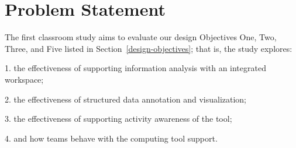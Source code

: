 \section{Problem Statement}

The first classroom study aims to evaluate our design Objectives One, Two, Three, and Five listed in Section~\ref{design-objectives}; that is, the study explores:

1. the effectiveness of supporting information analysis with an integrated workspace;

2. the effectiveness of structured data annotation and visualization;

3. the effectiveness of supporting activity awareness of the tool;

4. and how teams behave with the computing tool support.
